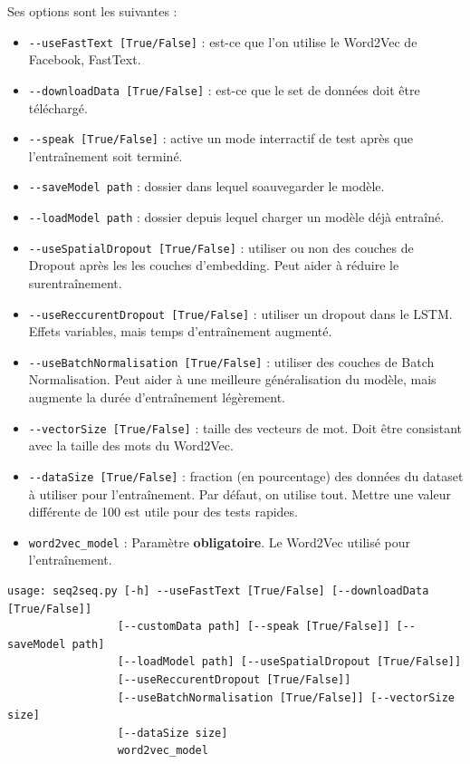 \documentclass[10pt,a4paper]{article}
\begin{document}
Ses options sont les suivantes :
\begin{itemize}
 \item \texttt{-{}-useFastText [True/False]} : est-ce que l'on utilise le Word2Vec de Facebook, FastText.
 \item \texttt{-{}-downloadData [True/False]} : est-ce que le set de données doit être téléchargé.
 \item \texttt{-{}-speak [True/False]} : active un mode interractif de test après que l'entraînement soit terminé.
 \item \texttt{-{}-saveModel path} : dossier dans lequel soauvegarder le modèle.
 \item \texttt{-{}-loadModel path} : dossier depuis lequel charger un modèle déjà entraîné.
 \item \texttt{-{}-useSpatialDropout [True/False]} : utiliser ou non des couches de Dropout après les les couches d'embedding. Peut aider à réduire le surentraînement.
 \item \texttt{-{}-useReccurentDropout [True/False]} : utiliser un dropout dans le LSTM. Effets variables, mais temps d'entraînement augmenté.
 \item \texttt{-{}-useBatchNormalisation [True/False]} : utiliser des couches de Batch Normalisation. Peut aider à une meilleure généralisation du modèle, mais augmente la durée d'entraînement légèrement.
 \item \texttt{-{}-vectorSize [True/False]} : taille des vecteurs de mot. Doit être consistant avec la taille des mots du Word2Vec.
 \item \texttt{-{}-dataSize [True/False]} : fraction (en pourcentage) des données du dataset à utiliser pour l'entraînement. Par défaut, on utilise tout. Mettre une valeur différente de 100 est utile pour des tests rapides.
 \item \texttt{word2vec\_model} : Paramètre \textbf{obligatoire}. Le Word2Vec utilisé pour l'entraînement.
\end{itemize}

\begin{verbatim}
usage: seq2seq.py [-h] --useFastText [True/False] [--downloadData [True/False]]
                 [--customData path] [--speak [True/False]] [--saveModel path]
                 [--loadModel path] [--useSpatialDropout [True/False]]
                 [--useReccurentDropout [True/False]]
                 [--useBatchNormalisation [True/False]] [--vectorSize size]
                 [--dataSize size]
                 word2vec_model
\end{verbatim}
\end{document}
